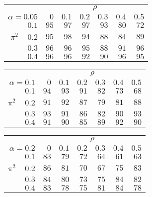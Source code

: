 \begin{tabular}{r|rrrrrr}
\hline\hline
 &\multicolumn{6}{c}{$\rho$} \\ 
 $\alpha = 0.05$ & $0$ & $0.1$ & $0.2$ & $0.3$ & $0.4$ & $0.5$ \\ 
 \hline$0.1$ & $95$ & $97$ & $97$ & $93$ & $80$ & $72$\\ 
$\pi^2\;\;\;$ $0.2$ & $95$ & $98$ & $94$ & $88$ & $84$ & $89$\\ 
$0.3$ & $96$ & $96$ & $95$ & $88$ & $91$ & $96$\\ 
$0.4$ & $96$ & $96$ & $92$ & $90$ & $96$ & $95$\\ 
 \hline 
 \end{tabular}
 
 \vspace{2em} 
 
\begin{tabular}{r|rrrrrr}
\hline\hline
 &\multicolumn{6}{c}{$\rho$} \\ 
 $\alpha = 0.1$ & $0$ & $0.1$ & $0.2$ & $0.3$ & $0.4$ & $0.5$ \\ 
 \hline$0.1$ & $94$ & $93$ & $91$ & $82$ & $73$ & $68$\\ 
$\pi^2\;\;\;$ $0.2$ & $91$ & $92$ & $87$ & $79$ & $81$ & $88$\\ 
$0.3$ & $93$ & $91$ & $86$ & $82$ & $90$ & $93$\\ 
$0.4$ & $91$ & $90$ & $85$ & $89$ & $92$ & $90$\\ 
 \hline 
 \end{tabular}
 
 \vspace{2em} 
 
\begin{tabular}{r|rrrrrr}
\hline\hline
 &\multicolumn{6}{c}{$\rho$} \\ 
 $\alpha = 0.2$ & $0$ & $0.1$ & $0.2$ & $0.3$ & $0.4$ & $0.5$ \\ 
 \hline$0.1$ & $83$ & $79$ & $72$ & $64$ & $61$ & $63$\\ 
$\pi^2\;\;\;$ $0.2$ & $86$ & $81$ & $70$ & $67$ & $75$ & $83$\\ 
$0.3$ & $84$ & $80$ & $73$ & $75$ & $84$ & $82$\\ 
$0.4$ & $83$ & $78$ & $75$ & $81$ & $84$ & $78$\\ 
 \hline 
 \end{tabular}